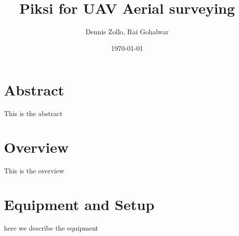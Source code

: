 \documentclass{article}
\title{Piksi for UAV Aerial surveying}
\author{Dennis Zollo, Rai Gohalwar}
\date{\today}
\begin{document}
\maketitle

\thispagestyle{firstpage}

\section{Abstract}
\label{sec:abstract}
This is the abstract
\tableofcontents
\newpage
\section{Overview}
\label{sec:Overview}
This is the overview
\section{Equipment and Setup}
\label{sec:equipment}
here we describe the equipment
\thispagestyle{lastpage}
\end{document}
